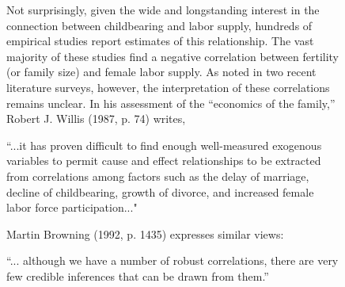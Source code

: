 \documentclass{article}
\begin{document}
\begin{figure}[!htbp]
{\begin{minipage}{45em}
\hspace{1cm} Not surprisingly, given the wide and longstanding interest in the connection between childbearing and labor supply, hundreds of empirical studies report estimates of this relationship. The vast majority of these studies find a negative correlation between fertility (or family size) and female labor supply. As noted in two recent literature surveys, however, the interpretation of these correlations remains unclear. In his assessment of the ``economics of the family,'' Robert J. Willis (1987, p. 74) writes,
\begin{displayquote}
``...it has proven difficult to find enough well-measured exogenous variables to permit cause and effect relationships to be extracted from correlations among factors such as the delay of marriage, decline of childbearing, growth of divorce, and increased female labor force participation..."
\end{displayquote}
Martin Browning (1992, p. 1435) expresses similar views:
\begin{displayquote}
``... although we have a number of robust correlations, there are very few credible inferences that can be drawn from them.''
\end{displayquote}
\vspace{.5cm}

\end{minipage}}
\end{figure}
\end{document}
